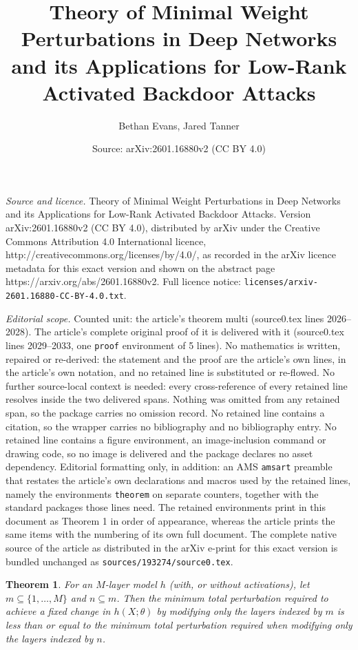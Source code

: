 \documentclass[10pt,a4paper]{amsart}
\title{Theory of Minimal Weight Perturbations in Deep Networks and its Applications for Low-Rank Activated Backdoor Attacks}
\author{Bethan Evans, Jared Tanner}
\date{Source: arXiv:2601.16880v2 (CC BY 4.0)}
\newtheorem{theorem}{Theorem}
\begin{document}
\maketitle

\noindent\emph{Source and licence.} Theory of Minimal Weight Perturbations in Deep Networks and its Applications for Low-Rank Activated Backdoor Attacks. Version arXiv:2601.16880v2 (CC BY 4.0), distributed by arXiv under the Creative Commons Attribution 4.0 International licence, http://creativecommons.org/licenses/by/4.0/, as recorded in the arXiv licence metadata for this exact version and shown on the abstract page https://arxiv.org/abs/2601.16880v2. Full licence notice: \texttt{licenses/arxiv-2601.16880-CC-BY-4.0.txt}.\par\smallskip

\noindent\textit{Editorial scope.} Counted unit: the article's theorem multi (source0.tex lines 2026--2028). The article's complete original proof of it is delivered with it (source0.tex lines 2029--2033, one \texttt{proof} environment of 5 lines). No mathematics is written, repaired or re-derived: the statement and the proof are the article's own lines, in the article's own notation, and no retained line is substituted or re-flowed.  No further source-local context is needed: every cross-reference of every retained line resolves inside the two delivered spans.  Nothing was omitted from any retained span, so the package carries no omission record.  No retained line contains a citation, so the wrapper carries no bibliography and no bibliography entry.  No retained line contains a figure environment, an image-inclusion command or drawing code, so no image is delivered and the package declares no asset dependency.  Editorial formatting only, in addition: an AMS \texttt{amsart} preamble that restates the article's own declarations and macros used by the retained lines, namely the environments \texttt{theorem} on separate counters, together with the standard packages those lines need.  The retained environments print in this document as Theorem 1 in order of appearance, whereas the article prints the same items with the numbering of its own full document.  The complete native source of the article as distributed in the arXiv e-print for this exact version is bundled unchanged as \texttt{sources/193274/source0.tex}.
\begin{theorem}\label{multi}
For an $M$-layer model $h$ (with, or without activations), let $m \subseteq \{1, \ldots, M\}$ and $n \subseteq m$. Then the minimum total perturbation required to achieve a fixed change in $h(X; \theta)$ by modifying only the layers indexed by $m$ is less than or equal to the minimum total perturbation required when modifying only the layers indexed by $n$.
\end{theorem}
\end{document}
